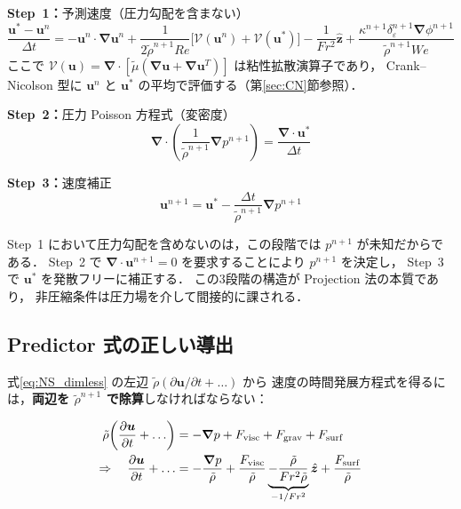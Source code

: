 \documentclass[12pt, a4paper, titlepage]{article}
\newcommand{\jp}[1]{{\normalfont\jpfont #1}}
\newcommand{\pd}[2]{\dfrac{\partial #1}{\partial #2}}
\newcommand{\bu}{\bm{u}}
\newcommand{\bnabla}{\bm{\nabla}}
\newcommand{\de}{\delta_\varepsilon}
\begin{document}
\begin{tcolorbox}[algbox, title={\jp{Projection 法の3段階}}]
\textbf{Step~1\jp{：}}\jp{予測速度（圧力勾配を含まない）}
\begin{equation}
  \frac{\bu^* - \bu^n}{\Delta t}
  = -\bu^n\cdot\bnabla\bu^n
  + \frac{1}{2\tilde{\rho}^{n+1} Re}\bigl[\mathcal{V}(\bu^n) + \mathcal{V}(\bu^*)\bigr]
  - \frac{1}{Fr^2}\hat{\bm{z}}
  + \frac{\kappa^{n+1}\de^{n+1}\bnabla\phi^{n+1}}{\tilde{\rho}^{n+1} We}
  \label{eq:predictor}
\end{equation}
\jp{ここで $\mathcal{V}(\bu) = \bnabla\cdot[\tilde\mu(\bnabla\bu+\bnabla\bu^T)]$ は粘性拡散演算子であり，
Crank--Nicolson 型に $\bu^n$ と $\bu^*$ の平均で評価する（第\ref{sec:CN}節参照）．}

\textbf{Step~2\jp{：}}\jp{圧力 Poisson 方程式（変密度）}
\begin{equation}
  \bnabla\cdot\!\left(\frac{1}{\tilde{\rho}^{n+1}}\bnabla p^{n+1}\right)
  = \frac{\bnabla\cdot\bu^*}{\Delta t}
  \label{eq:PPE_operator}
\end{equation}

\textbf{Step~3\jp{：}}\jp{速度補正}
\begin{equation}
  \bu^{n+1} = \bu^* - \frac{\Delta t}{\tilde{\rho}^{n+1}}\bnabla p^{n+1}
  \label{eq:corrector}
\end{equation}
\end{tcolorbox}

\jp{Step~1 において圧力勾配を含めないのは，この段階では $p^{n+1}$ が未知だからである．
Step~2 で $\bnabla\cdot\bu^{n+1}=0$ を要求することにより $p^{n+1}$ を決定し，
Step~3 で $\bu^*$ を発散フリーに補正する．
この3段階の構造が Projection 法の本質であり，
非圧縮条件は圧力場を介して間接的に課される．}

\subsection{\jp{Predictor 式の正しい導出}}

\jp{式\eqref{eq:NS_dimless} の左辺 $\tilde\rho(\partial\bu/\partial t + \ldots)$ から
速度の時間発展方程式を得るには，\textbf{両辺を $\tilde\rho^{n+1}$ で除算}しなければならない：}

\begin{align}
  \tilde\rho\!\left(\pd{\bu}{t} + \ldots\right) &= -\bnabla p + F_{\mathrm{visc}} + F_{\mathrm{grav}} + F_{\mathrm{surf}} \notag\\
  \Rightarrow\quad
  \pd{\bu}{t} + \ldots &= -\frac{\bnabla p}{\tilde\rho} + \frac{F_{\mathrm{visc}}}{\tilde\rho}
    \underbrace{- \frac{\tilde\rho}{Fr^2\tilde\rho}}_{-1/Fr^2}\hat{\bm{z}} + \frac{F_{\mathrm{surf}}}{\tilde\rho}
\end{align}
\end{document}
